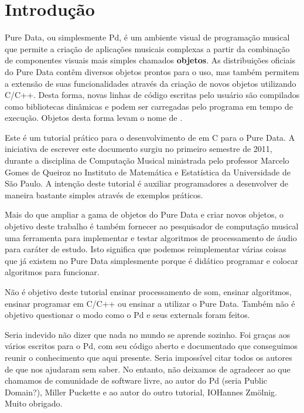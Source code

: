  
\chapter{Introdução}

Pure Data, ou simplesmente Pd, é um ambiente visual de programação musical que permite a criação de
aplicações musicais complexas a partir da combinação de componentes visuais
mais simples chamados \textbf{objetos}. As distribuições oficiais do Pure Data
contêm diversos objetos prontos para o uso, mas também permitem a extensão de
suas funcionalidades através da criação de novos objetos utilizando C/C++.
Desta forma, novas linhas de código escritas pelo usuário são compilados como
bibliotecas dinâmicas e podem ser carregadas pelo programa em tempo de
execução. Objetos desta forma levam o nome de \textbf{\externals}.

Este é um tutorial prático para o desenvolvimento de \externals em C para o
Pure Data. A iniciativa de escrever este documento surgiu no primeiro semestre
de 2011, durante a disciplina de Computação Musical ministrada pelo professor
Marcelo Gomes de Queiroz no Instituto de Matemática e Estatística da
Universidade de São Paulo. A intenção deste tutorial é auxiliar programadores
a desenvolver \externals de maneira bastante simples através de exemplos
práticos.

Mais do que ampliar a gama de objetos do Pure Data e criar novos objetos, o
objetivo deste trabalho é também fornecer ao pesquisador de computação musical
uma ferramenta para implementar e testar algoritmos de processamento de áudio
para caráter de estudo. Isto significa que podemos reimplementar várias coisas
que já existem no Pure Data simplesmente porque é didático programar e colocar
algoritmos para funcionar.

Não é objetivo deste tutorial ensinar processamento de som, ensinar algoritmos, 
ensinar programar em C/C++ ou ensinar a utilizar o Pure Data. Também não é objetivo
questionar o modo como o Pd e seus externals foram feitos.


Seria indevido não dizer que nada no mundo se aprende sozinho. Foi graças aos vários
\externals escritos para o Pd, com seu código aberto e documentado que conseguimos
reunir o conhecimento que aqui presente. Seria impossível citar todos os autores 
de \externals que nos ajudaram sem saber. No entanto, não deixamos de agradecer ao
que chamamos de comunidade de software livre, ao autor do Pd (seria Public Domain?), 
Miller Puckette e ao autor do outro tutorial, IOHannes Zmölnig. Muito obrigado.

